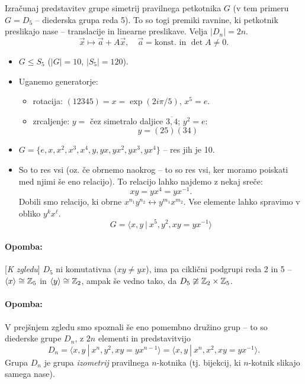 \begin{zgled}
	Izra\v cunaj predstavitev grupe simetrij pravilnega petkotnika $G$ (v tem primeru $G = D_5$ -- diederska grupa reda 5).
	To so togi premiki ravnine, ki petkotnik preslikajo nase -- translacije in linearne preslikave. Velja $|D_n| = 2n$.
	\[
		\vec{x} \mapsto \vec{a} + A\vec{x},\quad \vec{a} = \text{konst. in } \det A \neq 0.
	\]
	\begin{itemize}
		\item{$G \leq S_5$ ($|G| = 10$, $|S_5| = 120$).}
		\item{Uganemo generatorje:
			\begin{itemize}
				\item{rotacija: $(12345)= x = \exp(2i\pi/5)$, $x^5 = e$.}
				\item{zrcaljenje: $y =$ \v cez simetralo daljice $\overline{3,4}$; $y^2 = e$:
					\[
						y = (25)(34)
					\]}
			\end{itemize}
		}
		\item{$G = \{e, x, x^2, x^3, x^4, y, yx, yx^2, yx^3, yx^4\}$ -- res jih je 10.}
		\item{So to res vsi (oz. \v ce obrnemo naokrog -- to so res vsi, ker moramo poiskati med njimi \v se eno relacijo).
			To relacijo lahko najdemo z nekaj sre\v ce:
			\[
				xy = yx^4 = yx^{-1}.
			\]
			Dobili smo relacijo, ki obrne $x^{n_1}y^{n_2} \leftrightarrow y^{m_1}x^{m_2}$. Vse elemente lahko spravimo
			v obliko $y^kx^\ell$.
			\[
				G = \langle x,y\ |\ x^5, y^2, xy = yx^{-1}\rangle
			\]}
	\end{itemize}
\end{zgled}

\paragraph{Opomba:} [{\em K zgledu}] $D_5$ ni komutativna ($xy \neq yx$), ima pa cikli\v cni podgrupi reda 2 in 5 -- $\langle x
\rangle \cong \mathbb{Z}_5$ in $\langle y \rangle \cong \mathbb{Z}_2$, ampak \v se vedno tako, da $D_5 \ncong \mathbb{Z}_2 \times \mathbb{Z}_5$.

\paragraph{Opomba:}
V prej\v snjem zgledu smo spoznali \v se eno pomembno dru\v zino grup -- to so diederske grupe $D_n$, z $2n$ elementi in
predstavitvijo
\[
	D_n = \langle x, y\ |\ x^n, y^2, xy = yx^{n-1} \rangle = \langle x, y\ |\ x^n, x^2, xy = yx^{-1} \rangle.
\]
Grupa $D_n$ je grupa \emph{izometrij} pravilnega $n$-kotnika (tj. bijekcij, ki $n$-kotnik slikajo samega nase).


